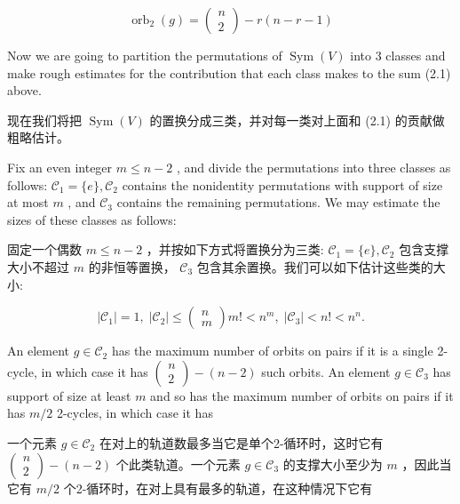 \documentclass[10pt]{article}
\begin{document}
\[
{\operatorname{orb}}_{2}\left( g\right)  = \left( \begin{array}{l} n \\  2 \end{array}\right)  - r\left( {n - r - 1}\right)
\]

Now we are going to partition the permutations of \(\operatorname{Sym}\left( V\right)\) into 3 classes and make rough estimates for the contribution that each class makes to the sum (2.1) above.

\begin{tcolorbox}\relax
现在我们将把 \(\operatorname{Sym}\left( V\right)\) 的置换分成三类，并对每一类对上面和 (2.1) 的贡献做粗略估计。
\end{tcolorbox}

Fix an even integer \(m \leq  n - 2\) , and divide the permutations into three classes as follows: \({\mathcal{C}}_{1} = \{ e\} ,{\mathcal{C}}_{2}\) contains the nonidentity permutations with support of size at most \(m\) , and \({\mathcal{C}}_{3}\) contains the remaining permutations. We may estimate the sizes of these classes as follows:

\begin{tcolorbox}\relax
固定一个偶数 \(m \leq  n - 2\) ，并按如下方式将置换分为三类: \({\mathcal{C}}_{1} = \{ e\} ,{\mathcal{C}}_{2}\) 包含支撑大小不超过 \(m\) 的非恒等置换， \({\mathcal{C}}_{3}\) 包含其余置换。我们可以如下估计这些类的大小:
\end{tcolorbox}

\[
\left| {\mathcal{C}}_{1}\right|  = 1,\;\left| {\mathcal{C}}_{2}\right|  \leq  \left( \begin{matrix} n \\  m \end{matrix}\right) m! < {n}^{m},\;\left| {\mathcal{C}}_{3}\right|  < n! < {n}^{n}.
\]

An element \(g \in  {\mathcal{C}}_{2}\) has the maximum number of orbits on pairs if it is a single 2-cycle, in which case it has \(\left( \begin{array}{l} n \\  2 \end{array}\right)  - \left( {n - 2}\right)\) such orbits. An element \(g \in  {\mathcal{C}}_{3}\) has support of size at least \(m\) and so has the maximum number of orbits on pairs if it has \(m/2\) 2-cycles, in which case it has

\begin{tcolorbox}\relax
一个元素 \(g \in  {\mathcal{C}}_{2}\) 在对上的轨道数最多当它是单个2-循环时，这时它有 \(\left( \begin{array}{l} n \\  2 \end{array}\right)  - \left( {n - 2}\right)\) 个此类轨道。一个元素 \(g \in  {\mathcal{C}}_{3}\) 的支撑大小至少为 \(m\) ，因此当它有 \(m/2\) 个2-循环时，在对上具有最多的轨道，在这种情况下它有
\end{tcolorbox}
\end{document}
